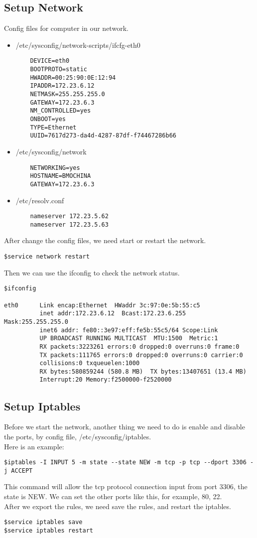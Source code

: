 \subsection{Setup Network}
Config files for computer in our network.
\begin{itemize}
    \item
    /etc/sysconfig/network-scripts/ifcfg-eth0
    \begin{lstlisting}
    DEVICE=eth0
    BOOTPROTO=static
    HWADDR=00:25:90:0E:12:94
    IPADDR=172.23.6.12
    NETMASK=255.255.255.0
    GATEWAY=172.23.6.3
    NM_CONTROLLED=yes
    ONBOOT=yes
    TYPE=Ethernet
    UUID=7617d273-da4d-4287-87df-f74467286b66
    \end{lstlisting}
    \item
    /etc/sysconfig/network
    \begin{lstlisting}
    NETWORKING=yes
    HOSTNAME=BMOCHINA
    GATEWAY=172.23.6.3
    \end{lstlisting}
    \item
    /etc/resolv.conf
    \begin{lstlisting}
    nameserver 172.23.5.62
    nameserver 172.23.5.63
    \end{lstlisting}
\end{itemize}
After change the config files, we need start or restart the network.
\begin{lstlisting}
$service network restart
\end{lstlisting}
Then we can use the ifconfig to check the network status.
\begin{lstlisting}
$ifconfig

eth0      Link encap:Ethernet  HWaddr 3c:97:0e:5b:55:c5  
          inet addr:172.23.6.12  Bcast:172.23.6.255  Mask:255.255.255.0
          inet6 addr: fe80::3e97:eff:fe5b:55c5/64 Scope:Link
          UP BROADCAST RUNNING MULTICAST  MTU:1500  Metric:1
          RX packets:3223261 errors:0 dropped:0 overruns:0 frame:0
          TX packets:111765 errors:0 dropped:0 overruns:0 carrier:0
          collisions:0 txqueuelen:1000 
          RX bytes:580859244 (580.8 MB)  TX bytes:13407651 (13.4 MB)
          Interrupt:20 Memory:f2500000-f2520000 
\end{lstlisting}

\subsection{Setup Iptables}
Before we start the network, another thing we need to do is enable and disable the ports, by config file, /etc/sysconfig/iptables.\\
Here is an example:
\begin{lstlisting}
$iptables -I INPUT 5 -m state --state NEW -m tcp -p tcp --dport 3306 -j ACCEPT
\end{lstlisting}
This command will allow the tcp protocol connection input from port 3306, the state is NEW.
We can set the other ports like this, for example, 80, 22.\\
After we export the rules, we need save the rules, and restart the iptables.
\begin{lstlisting}
$service iptables save 
$service iptables restart 
\end{lstlisting}

